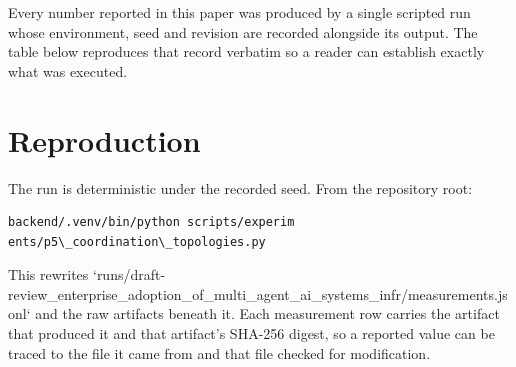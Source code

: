 \documentclass{article}
\begin{document}
Every number reported in this paper was produced by a single scripted run whose environment, seed and revision are recorded alongside its output. The table below reproduces that record verbatim so a reader can establish exactly what was executed.
\begin{table}[htbp]
\centering
{}
\end{table}


\section{Reproduction}


The run is deterministic under the recorded seed. From the repository root:


\begin{scriptsize}
\begin{verbatim}
backend/.venv/bin/python scripts/experim
ents/p5\_coordination\_topologies.py
\end{verbatim}
\end{scriptsize}


This rewrites `runs/draft-review\_enterprise\_adoption\_of\_multi\_agent\_ai\_systems\_infr/measurements.jsonl` and the raw artifacts beneath it. Each measurement row carries the artifact that produced it and that artifact's SHA-256 digest, so a reported value can be traced to the file it came from and that file checked for modification.
\end{document}

